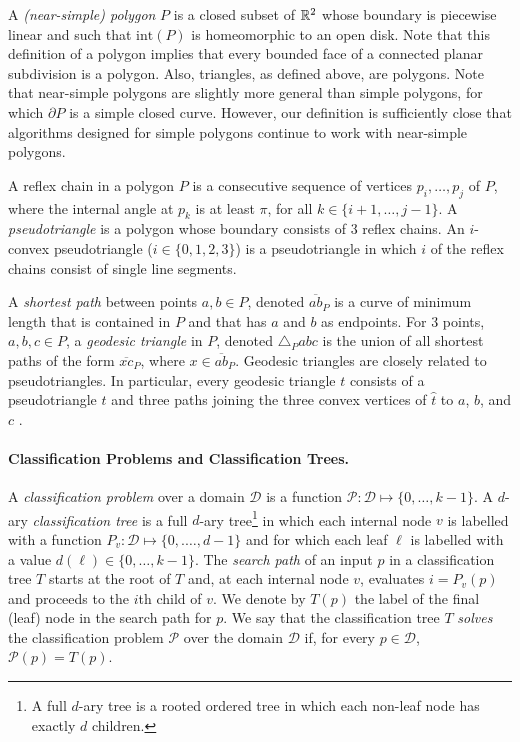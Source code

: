 \documentclass[acmtalg]{acmsmall}
\newcommand{\boundary}{\partial}
\newcommand{\interior}{\mathrm{int}}
\newcommand{\z}[1]{{\hat{#1}}}
\begin{document}
A \emph{(near-simple) polygon} $P$ is a closed subset of $\mathbb{R}^2$ whose
boundary is piecewise linear and such that $\interior(P)$ is
homeomorphic to an open disk.  Note that this definition of a polygon
implies that every bounded face of a connected planar subdivision is a
polygon.  Also, triangles, as defined above, are polygons.  Note that
near-simple polygons are slightly more general than simple polygons,
for which $\boundary P$ is a simple closed curve.  However, our
definition is sufficiently close that algorithms designed for simple
polygons continue to work with near-simple polygons.

A reflex chain in a polygon $P$ is a consecutive sequence of vertices
$p_i,\ldots,p_j$ of $P$, where the internal angle at $p_k$ is at least
$\pi$, for all $k\in\{i+1,\ldots,j-1\}$. A \emph{pseudotriangle} is a
polygon whose boundary consists of 3 reflex chains.  An $i$-convex
pseudotriangle ($i\in\{0,1,2,3\}$) is a pseudotriangle in which $i$ of
the reflex chains consist of single line segments.

A \emph{shortest path} between points $a,b\in P$, denoted
$\overline{ab}_P$ is a curve of minimum length that is contained in
$P$ and that has $a$ and $b$ as endpoints.  For 3 points, $a,b,c\in
P$, a \emph{geodesic triangle} in $P$, denoted $\triangle_P abc$ is
the union of all shortest paths of the form $\overline{xc}_P$, where
$x\in\overline{ab}_P$.  Geodesic triangles are closely related to
pseudotriangles.  In particular, every geodesic triangle $t$ consists
of a pseudotriangle $\z t$ and three paths joining the three convex
vertices of $\z t$ to $a$, $b$, and $c$ \cite[Section~8.4]{rss06}.

\paragraph{Classification Problems and Classification Trees.}

A \emph{classification problem} over a domain $\mathcal{D}$ is a
function $\mathcal{P}:\mathcal{D}\mapsto \{0,\ldots,k-1\}$.  A
$d$-ary \emph{classification tree} is a full $d$-ary tree\footnote{A
full $d$-ary tree is a rooted ordered tree in which each non-leaf node
has exactly $d$ children.} in which each internal node $v$ is labelled
with a function $P_v:\mathcal{D}\mapsto\{0,.\ldots,d-1\}$ and for
which each leaf $\ell$ is labelled with a value
$d(\ell)\in\{0,\ldots,k-1\}$. The \emph{search path} of an input $p$
in a classification tree $T$ starts at the root of $T$ and, at each
internal node $v$, evaluates $i=P_v(p)$ and proceeds to the $i$th
child of $v$.  We denote by $T(p)$ the label of the final (leaf) node
in the search path for $p$.  We say that the classification tree $T$
\emph{solves} the classification problem $\mathcal{P}$ over the domain
$\mathcal{D}$ if, for every $p\in \mathcal{D}$, $\mathcal{P}(p)=T(p)$.
\end{document}
